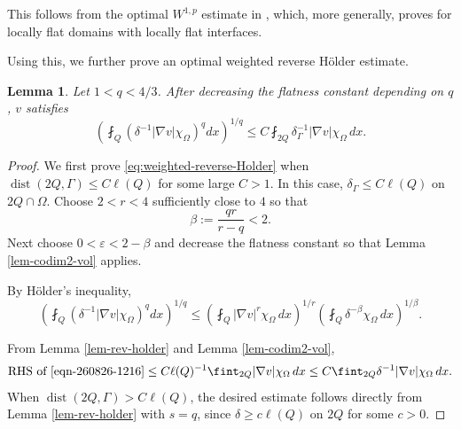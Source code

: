 \documentclass[12pt]{amsart}
\newtheorem{lemma}[theorem]{Lemma}
\numberwithin{equation}{section}
\newcommand\dist{\operatorname{dist}}
\newcommand{\epsi}{\varepsilon}
\begin{document}
This follows from the optimal $W^{1,p}$ estimate in \cite[Corollary~4.2]{MR4232502}, which, more generally, proves for locally flat domains with locally flat interfaces.

\medskip

Using this, we further prove an optimal weighted reverse H\"older estimate.

\begin{lemma}
 \label{lem:weighted-reverse-Holder}
 Let $1<q<4/3$.  After decreasing the flatness constant depending on
$q$, $v$ satisfies
\begin{equation}
 \left(\fint_{Q}
  \left(\delta^{-1}|\nabla v|\chi_\Omega\right)^q dx
 \right)^{1/q}
 \leq C\fint_{2Q}
  \delta_\Gamma^{-1}|\nabla v|\chi_\Omega\,dx.
 \label{eq:weighted-reverse-Holder}
\end{equation}
\end{lemma}

\begin{proof}
We first prove \eqref{eq:weighted-reverse-Holder} when $\dist(2Q,\Gamma) \leq C \ell(Q)$ for some large $C>1$.  In this case, $\delta_\Gamma\leq C\ell(Q)$ on $2Q\cap\Omega$. Choose $2<r<4$ sufficiently close to $4$ so that
\begin{equation}
 \beta:=\frac{qr}{r-q}<2.
 \label{eq:weighted-beta}
\end{equation}
Next choose $0<\epsi <2-\beta$ and decrease the flatness constant so that
Lemma \ref{lem-codim2-vol} applies.

By H\"older's inequality,
\begin{equation} \label{eqn-260826-1216}
 \left(\fint_{Q}
  \left( \delta^{-1} |\nabla v|\chi_\Omega\right)^q dx
 \right)^{1/q}
 \leq
 \left(\fint_{Q}|\nabla v|^r\chi_\Omega\,dx\right)^{1/r}
 \left(\fint_{Q}\delta^{-\beta}\chi_\Omega\,dx\right)^{1/\beta}.
\end{equation}

From Lemma \ref{lem-rev-holder} and Lemma \ref{lem-codim2-vol},
\begin{align*}
    \text{RHS of}\,\,\eqref{eqn-260826-1216}
     \leq C\ell(Q)^{-1}
       \fint_{2Q}|\nabla v|\chi_\Omega\,dx
 \leq C\fint_{2Q}
       \delta^{-1}|\nabla v|\chi_\Omega\,dx.
\end{align*}
When $\dist(2Q,\Gamma)> C \ell(Q)$, the desired estimate follows directly from Lemma \ref{lem-rev-holder} with $s=q$, since $\delta \geq c \ell(Q)$ on $2Q$ for some $c>0$. 
\end{proof}
\end{document}
